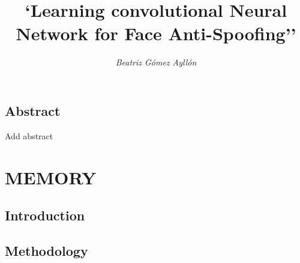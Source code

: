\documentclass[12pt,a4paper,titlepage,twoside]{book}
\title{\Huge \textbf{`Learning convolutional Neural Network for Face Anti-Spoofing''}}
\author{\Huge \textit{Beatriz G\'omez Ayll\'on}}
\newcommand{\blankpage}{
\newpage \thispagestyle{empty}
\emph{  }
\newpage
}
\begin{document}
\mtcaddchapter %

\frontmatter
\marginsize{3.0cm}{2.0cm}{3.5cm}{2.5cm}


%




%


\maketitle
\blankpage %

%

%	


\chapter*{Abstract}
Add abstract


\tableofcontents %


\mainmatter
\part{MEMORY}

\chapter{Introduction}
\label{chapter:Intro}
  
  
  
  
  
  
\chapter{Methodology}
  
  





\fancyhead[RO]{} %
\listoffigures 	%
\blankpage
\listoftables
\blankpage
\end{document}
